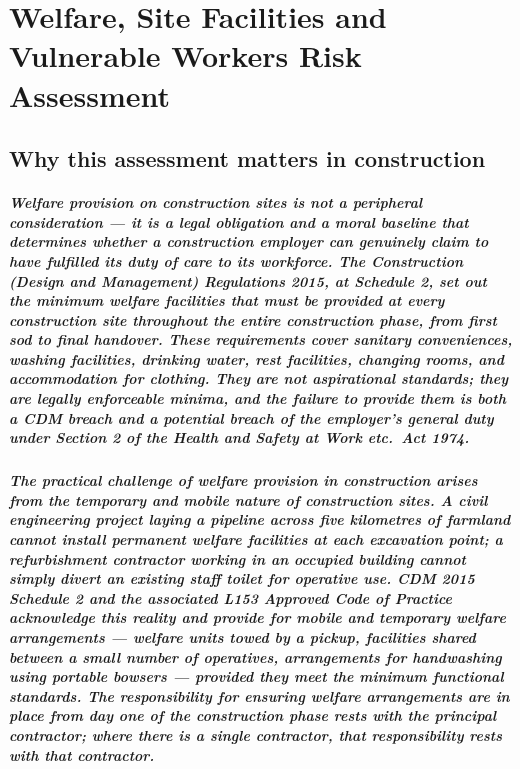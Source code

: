 \chapter{Welfare, Site Facilities and Vulnerable Workers Risk Assessment}
\label{chap:Welfare, Site Facilities and Vulnerable Workers Risk Assessment}

\section{Why this assessment matters in construction}

\paragraph{Welfare provision on construction sites is not a peripheral consideration --- it is a legal obligation and a moral baseline that determines whether a construction employer can genuinely claim to have fulfilled its duty of care to its workforce. The Construction (Design and Management) Regulations 2015, at Schedule 2, set out the minimum welfare facilities that must be provided at every construction site throughout the entire construction phase, from first sod to final handover. These requirements cover sanitary conveniences, washing facilities, drinking water, rest facilities, changing rooms, and accommodation for clothing. They are not aspirational standards; they are legally enforceable minima, and the failure to provide them is both a CDM breach and a potential breach of the employer's general duty under Section 2 of the Health and Safety at Work etc.\ Act 1974.}

\paragraph{The practical challenge of welfare provision in construction arises from the temporary and mobile nature of construction sites. A civil engineering project laying a pipeline across five kilometres of farmland cannot install permanent welfare facilities at each excavation point; a refurbishment contractor working in an occupied building cannot simply divert an existing staff toilet for operative use. CDM 2015 Schedule 2 and the associated L153 Approved Code of Practice acknowledge this reality and provide for mobile and temporary welfare arrangements --- welfare units towed by a pickup, facilities shared between a small number of operatives, arrangements for handwashing using portable bowsers --- provided they meet the minimum functional standards. The responsibility for ensuring welfare arrangements are in place from day one of the construction phase rests with the principal contractor; where there is a single contractor, that responsibility rests with that contractor.}

